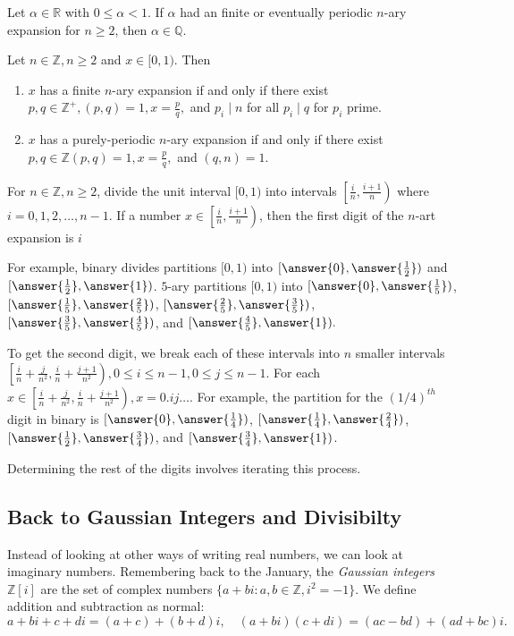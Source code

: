 \documentclass{ximera}
\begin{document}
\begin{theorem}
 Let $\alpha\in\mathbb{R}$ with $0\leq\alpha<1$. If $\alpha$ had an finite or eventually periodic $n$-ary expansion for $n\geq 2$, then $\alpha\in\mathbb{Q}$.
\end{theorem}

\begin{theorem}
 Let $n\in\mathbb{Z}, n\geq 2$ and $x\in[0,1)$. Then
 
\begin{enumerate}
 \item $x$ has a finite $n$-ary expansion if and only if there exist $p,q\in\mathbb{Z}^{+},(p,q)=1,x=\frac{p}{q},$ and $p_i\mid n$ for all $p_i\mid q$ for $p_i$ prime.
 \item $x$ has a purely-periodic $n$-ary expansion if and only if there exist $p,q\in\mathbb{Z}(p,q)=1,x=\frac{p}{q},$ and $(q,n)=1$.
\end{enumerate}
\end{theorem}


For $n\in\mathbb{Z},n\geq2$, divide the unit interval $[0,1)$ into intervals $\left[\frac{i}{n},\frac{i+1}{n}\right)$ where $i=0,1,2,\dots,n-1$. If a number $x\in\left[\frac{i}{n},\frac{i+1}{n}\right)$, then the first digit of the $n$-art expansion is $i$

For example, binary divides partitions $[0,1)$ into $[\answer{0},\answer{\frac{1}{2}})$ and $[\answer{\frac{1}{2}},\answer{1})$. $5$-ary partitions $[0,1)$ into $[\answer{0},\answer{\frac{1}{5}})$,$[\answer{\frac{1}{5}},\answer{\frac{2}{5}})$, $[\answer{\frac{2}{5}},\answer{\frac{3}{5}})$,$[\answer{\frac{3}{5}},\answer{\frac{4}{5}})$, and 
$[\answer{\frac{4}{5}},\answer{1}).$ 

To get the second digit, we break each of these intervals into $n$ smaller intervals $\left[\frac{i}{n}+\frac{j}{n^2},\frac{i}{n}+\frac{j+1}{n^2}\right), 0\leq i\leq n-1,0\leq j\leq n-1$. For each $x\in\left[\frac{i}{n}+\frac{j}{n^2},\frac{i}{n}+\frac{j+1}{n^2}\right), x=0.ij\dots.$ 
For example, the partition for the $(1/4)^{th}$ digit in binary is $[\answer{0},\answer{\frac{1}{4}})$, $[\answer{\frac{1}{4}},\answer{\frac{2}{4}})$, $[\answer{\frac{1}{2}},\answer{\frac{3}{4}})$, and $[\answer{\frac{3}{4}},\answer{1})$.

Determining the rest of the digits involves iterating this process.

\subsection{Back to Gaussian Integers and Divisibilty}
Instead of looking at other ways of writing real numbers, we can look at imaginary numbers.
Remembering back to the January, the \emph{Gaussian integers $\mathbb{Z}[i]$} are the set of complex numbers $\{a+bi:a,b\in\mathbb{Z}, i^2=-1\}$. We define addition and subtraction as normal: \[a+bi+c+di=(a+c)+(b+d)i,\quad (a+bi)(c+di)=(ac-bd)+(ad+bc)i.\]
\end{document}
